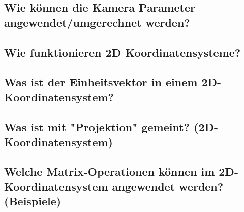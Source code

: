 \subsection{Wie können die Kamera Parameter angewendet/umgerechnet werden?}

\subsection{Wie funktionieren 2D Koordinatensysteme?}

\subsection{Was ist der Einheitsvektor in einem 2D-Koordinatensystem?}

\subsection{Was ist mit "Projektion" gemeint? (2D-Koordinatensystem)}

\subsection{Welche Matrix-Operationen können im 2D-Koordinatensystem angewendet werden? (Beispiele)}


